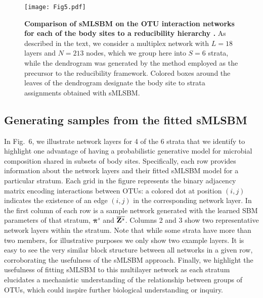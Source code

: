 \begin{figure}[t]
\begin{center}
\texttt{[image: Fig5.pdf]}
\caption{{\bf Comparison of sMLSBM on the OTU interaction networks \cite{sparcc} for each of the body sites to a reducibility hierarchy \cite{domen}.} As described in the text, we consider a multiplex network with $L=18$ layers and $N=213$ nodes, which we group here into $S=6$ strata, while the dendrogram was generated by the method employed as the precursor to the reducibility framework. Colored boxes around the leaves of the dendrogram designate the body site to strata assignments obtained with sMLSBM.}
\end{center}
\end{figure}

\subsection{Generating samples from the fitted sMLSBM}

\indent In Fig.~6, we illustrate network layers for 4 of the 6 strata that we identify to highlight one advantage of having a probabilistic generative model for microbial composition shared in subsets of body sites. Specifically, each row provides information about the network layers and their fitted sMLSBM model for a particular stratum. Each grid in the figure represents the binary adjacency matrix encoding interactions between OTUs: a colored dot at position $(i,j)$ indicates the existence of an edge $(i,j)$ in the corresponding network layer.
In the first column of each row is a sample network generated with the learned SBM parameters of that stratum, $\overline{{\boldsymbol \pi}}^{s}$ and $\overline{{\bf Z}^{s}}$. Columns 2 and 3 show two representative network layers within the stratum. Note that while some strata have more than two members, for illustrative purposes we only show two example layers. 
It is easy to see the very similar block structure between all networks in a given row, corroborating the usefulness of the sMLSBM approach. Finally, we highlight the usefulness of fitting sMLSBM to this multilayer network as each stratum
 elucidates a mechanistic understanding of the relationship between groups of OTUs, which could inspire further biological understanding or inquiry. 

